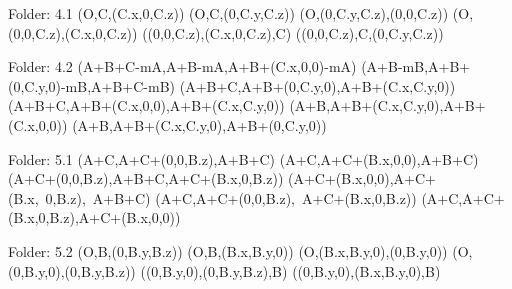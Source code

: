 Folder: 4.1
\left(O,C,\left(C.x,0,C.z\right)\right)
\left(O,C,\left(0,C.y,C.z\right)\right)
\left(O,\left(0,C.y,C.z\right),\left(0,0,C.z\right)\right)
\left(O,\left(0,0,C.z\right),\left(C.x,0,C.z\right)\right)
\left(\left(0,0,C.z\right),\left(C.x,0,C.z\right),C\right)
\left(\left(0,0,C.z\right),C,\left(0,C.y,C.z\right)\right)

Folder: 4.2
\left(A+B+C-mA,A+B-mA,A+B+\left(C.x,0,0\right)-mA\right)
\left(A+B-mB,A+B+\left(0,C.y,0\right)-mB,A+B+C-mB\right)
\left(A+B+C,A+B+\left(0,C.y,0\right),A+B+\left(C.x,C.y,0\right)\right)
\left(A+B+C,A+B+\left(C.x,0,0\right),A+B+\left(C.x,C.y,0\right)\right)
\left(A+B,A+B+\left(C.x,C.y,0\right),A+B+\left(C.x,0,0\right)\right)
\left(A+B,A+B+\left(C.x,C.y,0\right),A+B+\left(0,C.y,0\right)\right)

Folder: 5.1
\left(A+C,A+C+\left(0,0,B.z\right),A+B+C\right)
\left(A+C,A+C+\left(B.x,0,0\right),A+B+C\right)
\left(A+C+\left(0,0,B.z\right),A+B+C,A+C+\left(B.x,0,B.z\right)\right)
\left(A+C+\left(B.x,0,0\right),A+C+\left(B.x,\ 0,B.z\right),\ A+B+C\right)
\left(A+C,A+C+\left(0,0,B.z\right),\ A+C+\left(B.x,0,B.z\right)\right)
\left(A+C,A+C+\left(B.x,0,B.z\right),A+C+\left(B.x,0,0\right)\right)

Folder: 5.2
\left(O,B,\left(0,B.y,B.z\right)\right)
\left(O,B,\left(B.x,B.y,0\right)\right)
\left(O,\left(B.x,B.y,0\right),\left(0,B.y,0\right)\right)
\left(O,\left(0,B.y,0\right),\left(0,B.y,B.z\right)\right)
\left(\left(0,B.y,0\right),\left(0,B.y,B.z\right),B\right)
\left(\left(0,B.y,0\right),\left(B.x,B.y,0\right),B\right)

